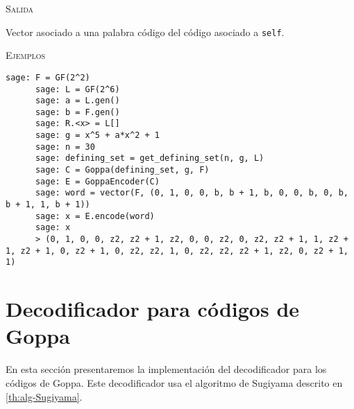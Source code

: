 \begin{description}[leftmargin=1em, font=\normalfont\ttfamily, style=nextline]
\begin{description}[font=\ttfamily, style=nextline]
    \textsc{Salida}
    \begin{description}[font=\normalfont\ttfamily]
        \item[] Vector asociado a una palabra código del código asociado a \texttt{self}.
    \end{description}

    \textsc{Ejemplos}
    \begin{lstlisting}[gobble=4]
      sage: F = GF(2^2)
      sage: L = GF(2^6)
      sage: a = L.gen()
      sage: b = F.gen()
      sage: R.<x> = L[]
      sage: g = x^5 + a*x^2 + 1
      sage: n = 30
      sage: defining_set = get_defining_set(n, g, L)
      sage: C = Goppa(defining_set, g, F)
      sage: E = GoppaEncoder(C)
      sage: word = vector(F, (0, 1, 0, 0, b, b + 1, b, 0, 0, b, 0, b, b + 1, 1, b + 1))
      sage: x = E.encode(word)
      sage: x
      > (0, 1, 0, 0, z2, z2 + 1, z2, 0, 0, z2, 0, z2, z2 + 1, 1, z2 + 1, z2 + 1, 0, z2 + 1, 0, z2, z2, 1, 0, z2, z2, z2 + 1, z2, 0, z2 + 1, 1)
    \end{lstlisting}
  \end{description}
\end{description}

\section{Decodificador para códigos de Goppa}

En esta sección presentaremos la implementación del decodificador para los códigos de Goppa. Este decodificador usa el algoritmo de Sugiyama descrito en \ref{th:alg-Sugiyama}.


